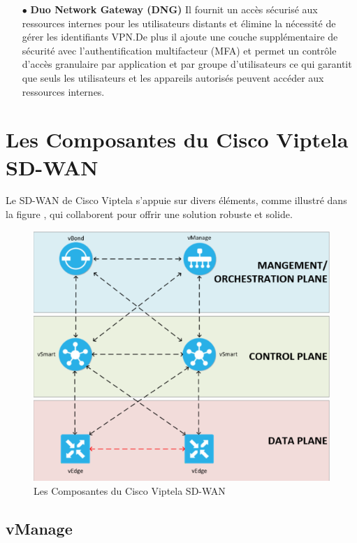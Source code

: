 \begin{itemize}
	\item[$\bullet$]\textbf{ Duo Network Gateway (DNG)} 
	Il fournit un accès sécurisé aux ressources internes pour les utilisateurs distants et élimine la nécessité de gérer les identifiants VPN.De plus il ajoute une couche supplémentaire de sécurité avec l'authentification multifacteur (MFA) et permet un contrôle d'accès granulaire par application et par groupe d'utilisateurs ce qui garantit que seuls les utilisateurs et les appareils autorisés peuvent accéder aux ressources internes.
\end{itemize}
\section{Les Composantes du Cisco Viptela SD-WAN  }

Le SD-WAN de Cisco Viptela s'appuie sur divers éléments, comme illustré dans la figure , qui collaborent pour offrir une solution robuste et solide.
\begin{figure} [H]
	\begin{center}
		\centering
		\hspace*{-0.5cm}
		\includegraphics{../image/composantes}
	\end{center}
	\caption{Les Composantes du Cisco Viptela SD-WAN }
\end{figure} 


\subsection{vManage}

